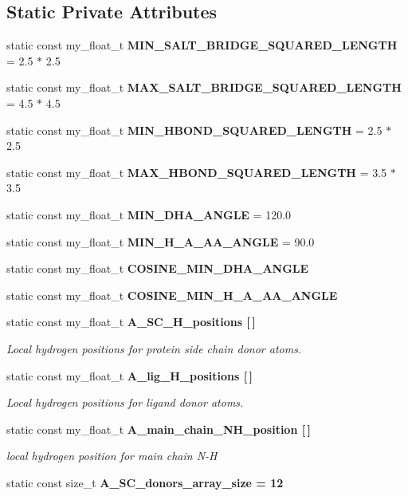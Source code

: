 \subsection*{Static Private Attributes}
\begin{CompactItemize}
\item 
static const my\_\-float\_\-t \textbf{MIN\_\-SALT\_\-BRIDGE\_\-SQUARED\_\-LENGTH} = 2.5 $\ast$ 2.5\label{classSimSite3D_1_1HbondGeometry_29c5c8d5d543d33470f10f31afd60d2f}

\item 
static const my\_\-float\_\-t \textbf{MAX\_\-SALT\_\-BRIDGE\_\-SQUARED\_\-LENGTH} = 4.5 $\ast$ 4.5\label{classSimSite3D_1_1HbondGeometry_69c3704548ade0b37b66654f5bae97df}

\item 
static const my\_\-float\_\-t \textbf{MIN\_\-HBOND\_\-SQUARED\_\-LENGTH} = 2.5 $\ast$ 2.5\label{classSimSite3D_1_1HbondGeometry_e2e30edec42fadce0889c782f6e59eeb}

\item 
static const my\_\-float\_\-t \textbf{MAX\_\-HBOND\_\-SQUARED\_\-LENGTH} = 3.5 $\ast$ 3.5\label{classSimSite3D_1_1HbondGeometry_6fba042f242b6e32bc9c14fd7341dbc3}

\item 
static const my\_\-float\_\-t \textbf{MIN\_\-DHA\_\-ANGLE} = 120.0\label{classSimSite3D_1_1HbondGeometry_196cfe032d7ed4df8990cee55cdcd687}

\item 
static const my\_\-float\_\-t \textbf{MIN\_\-H\_\-A\_\-AA\_\-ANGLE} = 90.0\label{classSimSite3D_1_1HbondGeometry_f80408c07c5fe34bbb7c095e2699ada3}

\item 
static const my\_\-float\_\-t \textbf{COSINE\_\-MIN\_\-DHA\_\-ANGLE}
\item 
static const my\_\-float\_\-t \textbf{COSINE\_\-MIN\_\-H\_\-A\_\-AA\_\-ANGLE}
\item 
static const my\_\-float\_\-t \bf{A\_\-SC\_\-H\_\-positions} [$\,$]
\begin{CompactList}\small\item\em Local hydrogen positions for protein side chain donor atoms. \item\end{CompactList}\item 
static const my\_\-float\_\-t \bf{A\_\-lig\_\-H\_\-positions} [$\,$]
\begin{CompactList}\small\item\em Local hydrogen positions for ligand donor atoms. \item\end{CompactList}\item 
static const my\_\-float\_\-t \bf{A\_\-main\_\-chain\_\-NH\_\-position} [$\,$]
\begin{CompactList}\small\item\em local hydrogen position for main chain N-H \item\end{CompactList}\item 
static const size\_\-t \bf{A\_\-SC\_\-donors\_\-array\_\-size} = 12\label{classSimSite3D_1_1HbondGeometry_309f9769bac2da03e5bfea01f3c6b205}


\end{CompactItemize}
